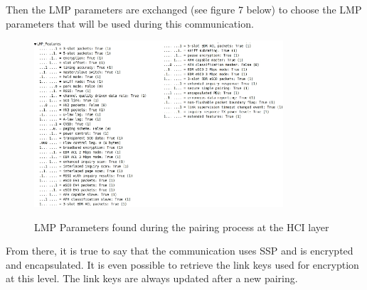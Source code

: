 Then the LMP parameters are exchanged (see figure 7 below) to choose the LMP parameters that will be used during this communication. 
\begin{figure}[!h]
  \begin{center}
	\includegraphics[width=350px]{images/LMP_PARAM.jpg}
	\label{fig:lmp}
	\caption{LMP Parameters found during the pairing process at the HCI layer}
  \end{center}
\end{figure}

From there, it is true to say that the communication uses SSP and is encrypted and encapsulated. It is even possible to retrieve the link keys used for encryption at this level. The link keys are always updated after a new pairing.
\newpage
